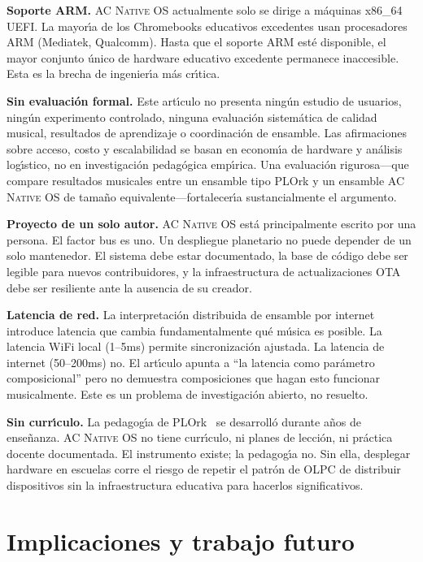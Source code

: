 \documentclass[10pt,letterpaper,twocolumn]{article}
\newcommand{\acos}{\textsc{AC Native OS}}
\begin{document}
\textbf{Soporte ARM.} \acos{} actualmente solo se dirige a m\'{a}quinas x86\_64 UEFI. La mayor\'{\i}a de los Chromebooks educativos excedentes usan procesadores ARM (Mediatek, Qualcomm). Hasta que el soporte ARM est\'{e} disponible, el mayor conjunto \'{u}nico de hardware educativo excedente permanece inaccesible. Esta es la brecha de ingenier\'{\i}a m\'{a}s cr\'{\i}tica.

\textbf{Sin evaluaci\'{o}n formal.} Este art\'{\i}culo no presenta ning\'{u}n estudio de usuarios, ning\'{u}n experimento controlado, ninguna evaluaci\'{o}n sistem\'{a}tica de calidad musical, resultados de aprendizaje o coordinaci\'{o}n de ensamble. Las afirmaciones sobre acceso, costo y escalabilidad se basan en econom\'{\i}a de hardware y an\'{a}lisis log\'{\i}stico, no en investigaci\'{o}n pedag\'{o}gica emp\'{\i}rica. Una evaluaci\'{o}n rigurosa---que compare resultados musicales entre un ensamble tipo PLOrk y un ensamble \acos{} de tama\~{n}o equivalente---fortalecer\'{\i}a sustancialmente el argumento.

\textbf{Proyecto de un solo autor.} \acos{} est\'{a} principalmente escrito por una persona. El factor bus es uno. Un despliegue planetario no puede depender de un solo mantenedor. El sistema debe estar documentado, la base de c\'{o}digo debe ser legible para nuevos contribuidores, y la infraestructura de actualizaciones OTA debe ser resiliente ante la ausencia de su creador.

\textbf{Latencia de red.} La interpretaci\'{o}n distribuida de ensamble por internet introduce latencia que cambia fundamentalmente qu\'{e} m\'{u}sica es posible. La latencia WiFi local (1--5ms) permite sincronizaci\'{o}n ajustada. La latencia de internet (50--200ms) no. El art\'{\i}culo apunta a ``la latencia como par\'{a}metro composicional'' pero no demuestra composiciones que hagan esto funcionar musicalmente. Este es un problema de investigaci\'{o}n abierto, no resuelto.

\textbf{Sin curr\'{\i}culo.} La pedagog\'{\i}a de PLOrk~\citep{trueman2007why} se desarroll\'{o} durante a\~{n}os de ense\~{n}anza. \acos{} no tiene curr\'{\i}culo, ni planes de lecci\'{o}n, ni pr\'{a}ctica docente documentada. El instrumento existe; la pedagog\'{\i}a no. Sin ella, desplegar hardware en escuelas corre el riesgo de repetir el patr\'{o}n de OLPC de distribuir dispositivos sin la infraestructura educativa para hacerlos significativos.


\section{Implicaciones y trabajo futuro}
\label{sec:future}
\end{document}
